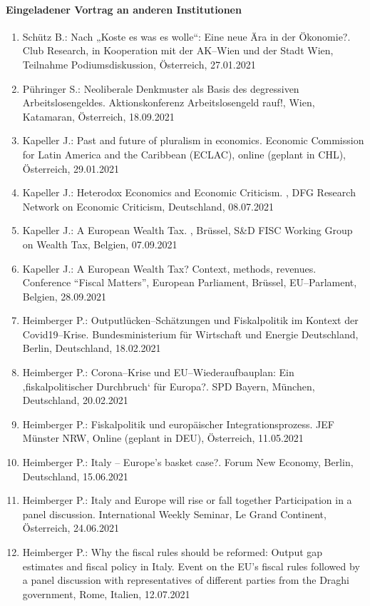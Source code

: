 \paragraph{Eingeladener Vortrag an anderen Institutionen}
\begin{enumerate}
	\item Schütz B.: Nach „Koste es was es wolle“: Eine neue Ära in der Ökonomie?. Club Research, in Kooperation mit der AK--Wien und der Stadt Wien, Teilnahme Podiumsdiskussion, Österreich, 27.01.2021
	\item Pühringer S.: Neoliberale Denkmuster als Basis des degressiven Arbeitslosengeldes. Aktionskonferenz Arbeitslosengeld rauf!, Wien, Katamaran, Österreich, 18.09.2021
	\item Kapeller J.: Past and future of pluralism in economics. Economic Commission for Latin America and the Caribbean (ECLAC), online (geplant in CHL), Österreich, 29.01.2021
	\item Kapeller J.: Heterodox Economics and Economic Criticism. , DFG Research Network on Economic Criticism, Deutschland, 08.07.2021
	\item Kapeller J.: A European Wealth Tax. , Brüssel, S\&D FISC Working Group on Wealth Tax, Belgien, 07.09.2021
	\item Kapeller J.: A European Wealth Tax? Context, methods, revenues. Conference “Fiscal Matters”, European Parliament, Brüssel, EU--Parlament, Belgien, 28.09.2021
	\item Heimberger P.: Outputlücken--Schätzungen und Fiskalpolitik im Kontext der Covid19--Krise. Bundesministerium für Wirtschaft und Energie Deutschland, Berlin, Deutschland, 18.02.2021
	\item Heimberger P.: Corona--Krise und EU--Wiederaufbauplan: Ein ‚fiskalpolitischer Durchbruch‘ für Europa?. SPD Bayern, München, Deutschland, 20.02.2021
	\item Heimberger P.: Fiskalpolitik und europäischer Integrationsprozess. JEF Münster NRW, Online (geplant in DEU), Österreich, 11.05.2021
	\item Heimberger P.: Italy -- Europe’s basket case?. Forum New Economy, Berlin, Deutschland, 15.06.2021
	\item Heimberger P.: Italy and Europe will rise or fall together Participation in a panel discussion. International Weekly Seminar, Le Grand Continent, Österreich, 24.06.2021
	\item Heimberger P.: Why the fiscal rules should be reformed: Output gap estimates and fiscal policy in Italy. Event on the EU’s fiscal rules followed by a panel discussion with representatives of different parties from the Draghi government, Rome, Italien, 12.07.2021

\end{enumerate}
